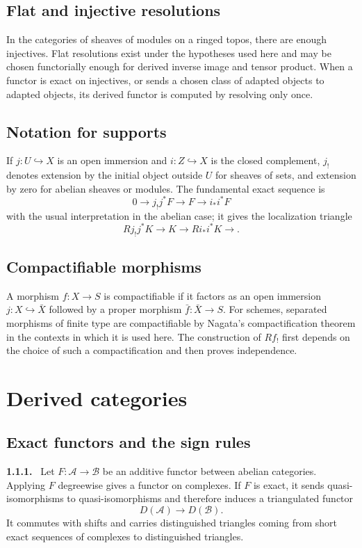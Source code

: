 \documentclass[12pt]{article}
\newcommand{\A}{\mathcal{A}}
\newcommand{\B}{\mathcal{B}}
\newenvironment{statement}[1]{\par\medskip\noindent\textbf{#1.}\ }{\par\medskip}
\begin{document}
\subsection{Flat and injective resolutions}
In the categories of sheaves of modules on a ringed topos, there are enough injectives. Flat resolutions exist under the hypotheses used here and may be chosen functorially enough for derived inverse image and tensor product. When a functor is exact on injectives, or sends a chosen class of adapted objects to adapted objects, its derived functor is computed by resolving only once.

\subsection{Notation for supports}
If \(j:U\hookrightarrow X\) is an open immersion and \(i:Z\hookrightarrow X\) is the closed complement, \(j_!\) denotes extension by the initial object outside \(U\) for sheaves of sets, and extension by zero for abelian sheaves or modules. The fundamental exact sequence is
\[
0\to j_!j^*F\to F\to i_*i^*F
\]
with the usual interpretation in the abelian case; it gives the localization triangle
\[
Rj_!j^*K\to K\to Ri_*i^*K\to.
\]

\subsection{Compactifiable morphisms}
A morphism \(f:X\to S\) is compactifiable if it factors as an open immersion \(j:X\hookrightarrow \bar X\) followed by a proper morphism \(\bar f:\bar X\to S\). For schemes, separated morphisms of finite type are compactifiable by Nagata's compactification theorem in the contexts in which it is used here. The construction of \(Rf_!\) first depends on the choice of such a compactification and then proves independence.

\section{Derived categories}

\subsection{Exact functors and the sign rules}

\begin{statement}{1.1.1}
Let \(F:\A\to\B\) be an additive functor between abelian categories. Applying \(F\) degreewise gives a functor on complexes. If \(F\) is exact, it sends quasi-isomorphisms to quasi-isomorphisms and therefore induces a triangulated functor
\[
D(\A)\longrightarrow D(\B).
\]
It commutes with shifts and carries distinguished triangles coming from short exact sequences of complexes to distinguished triangles.
\end{statement}
\end{document}
